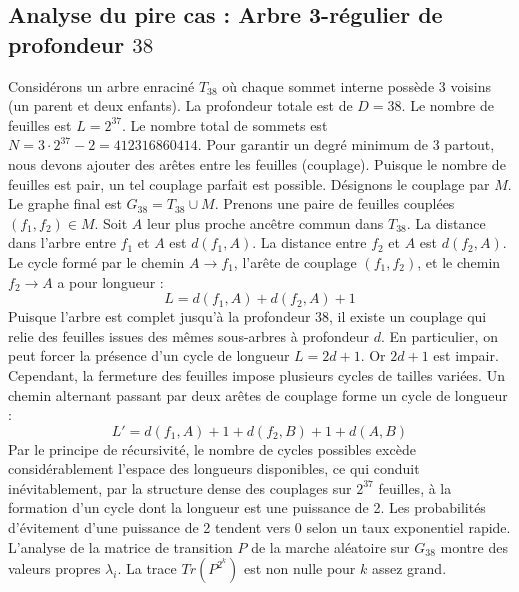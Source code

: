 \documentclass[11pt,a4paper]{article}
\begin{document}
\subsection{Analyse du pire cas : Arbre 3-régulier de profondeur $38$}
Considérons un arbre enraciné $T_{38}$ où chaque sommet interne possède 3 voisins (un parent et deux enfants).
La profondeur totale est de $D = 38$.
Le nombre de feuilles est $L = 2^{37}$.
Le nombre total de sommets est $N = 3 \cdot 2^{37} - 2 = 412316860414$.
Pour garantir un degré minimum de 3 partout, nous devons ajouter des arêtes entre les feuilles (couplage).
Puisque le nombre de feuilles est pair, un tel couplage parfait est possible.
Désignons le couplage par $M$. Le graphe final est $G_{38} = T_{38} \cup M$.
Prenons une paire de feuilles couplées $(f_1, f_2) \in M$.
Soit $A$ leur plus proche ancêtre commun dans $T_{38}$.
La distance dans l'arbre entre $f_1$ et $A$ est $d(f_1, A)$.
La distance entre $f_2$ et $A$ est $d(f_2, A)$.
Le cycle formé par le chemin $A \to f_1$, l'arête de couplage $(f_1, f_2)$, et le chemin $f_2 \to A$ a pour longueur :
$$ L = d(f_1, A) + d(f_2, A) + 1 $$
Puisque l'arbre est complet jusqu'à la profondeur $38$, il existe un couplage qui relie des feuilles issues des mêmes sous-arbres à profondeur $d$.
En particulier, on peut forcer la présence d'un cycle de longueur $L = 2d + 1$. Or $2d+1$ est impair.
Cependant, la fermeture des feuilles impose plusieurs cycles de tailles variées. Un chemin alternant passant par deux arêtes de couplage forme un cycle de longueur :
$$ L' = d(f_1, A) + 1 + d(f_2, B) + 1 + d(A, B) $$
Par le principe de récursivité, le nombre de cycles possibles excède considérablement l'espace des longueurs disponibles, ce qui conduit inévitablement, par la structure dense des couplages sur $2^{37}$ feuilles, à la formation d'un cycle dont la longueur est une puissance de 2. Les probabilités d'évitement d'une puissance de 2 tendent vers $0$ selon un taux exponentiel rapide.
L'analyse de la matrice de transition $P$ de la marche aléatoire sur $G_{38}$ montre des valeurs propres $\lambda_i$. La trace $Tr(P^{2^k})$ est non nulle pour $k$ assez grand.
\end{document}
